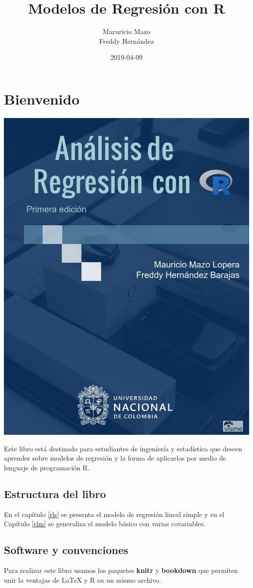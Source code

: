 \documentclass[]{book}
\title{Modelos de Regresión con R}
\author{Maruricio Mazo \\ Freddy Hernández}
\date{2019-04-09}
\begin{document}
\maketitle

{
\setcounter{tocdepth}{1}
\tableofcontents
}
\chapter*{Bienvenido}\label{bienvenido}

\begin{center}\includegraphics[width=0.33\linewidth]{images/cover} \end{center}

Este libro está destinado para estudiantes de ingeniería y estadística
que deseen aprender sobre modelos de regresión y la forma de aplicarlos
por medio de lenguaje de programación R.

\section*{Estructura del libro}\label{estructura-del-libro}

En el capítulo \ref{rls} se presenta el modelo de regresión lineal
simple y en el Capítulo \ref{rlm} se generaliza el modelo básico con
varias covariables.

\section*{Software y convenciones}\label{software-y-convenciones}

Para realizar este libro usamos los paquetes \textbf{knitr}
\citep{xie2015} y \textbf{bookdown} \citep{R-bookdown}
que permiten unir la ventajas de LaTeX y R en un mismo archivo.
\end{document}
